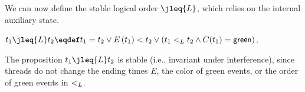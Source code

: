 We can now define the stable logical order $\jleq{\ordlist}$, which relies on
the internal auxiliary state.
%
\begin{definition}\label{def-jleq}
$t_1 \jleq{\ordlist} t_2 \eqdef t_1 = t_2 \vee E\,(t_1) < t_2 \vee (t_1 \tle t_2 \wedge \C(t_1) = \mathsf{green})$.
\end{definition}
The proposition $t_1 \jleq{\ordlist} t_2$ is stable (i.e., invariant under
interference), since threads do not change the ending times $E$, the
color of green events, or the order of green events in $\mathrel{<_L}$.

%
%


%




